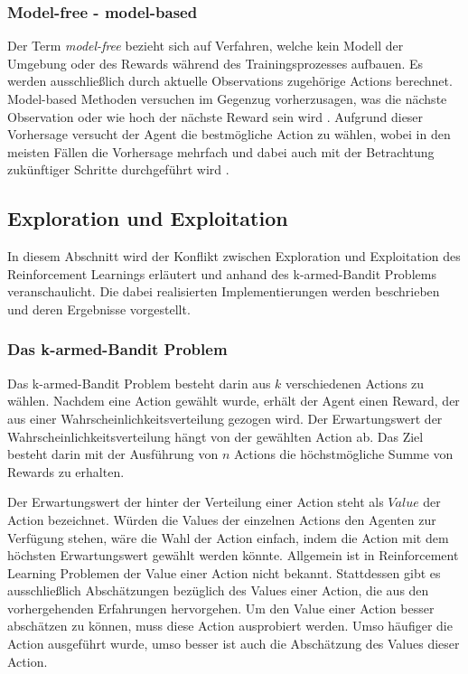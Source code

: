 \documentclass[11pt]{scrartcl}
\begin{document}
\subsubsection{Model-free - model-based}
Der Term \textit{model-free} bezieht sich auf Verfahren, welche kein Modell der Umgebung oder des Rewards
während des Trainingsprozesses aufbauen. Es werden ausschließlich durch aktuelle Observations
zugehörige Actions berechnet. Model-based Methoden versuchen im Gegenzug vorherzusagen, was 
die nächste Observation oder wie hoch der nächste Reward sein wird \cite[~S.NA]{L2018}. Aufgrund dieser
Vorhersage versucht der Agent die bestmögliche Action zu wählen, wobei in den meisten
Fällen die Vorhersage mehrfach und dabei auch mit der Betrachtung zukünftiger Schritte durchgeführt
wird \cite[~S.NA]{L2018}.


\subsection{Exploration und Exploitation}
In diesem Abschnitt wird der Konflikt zwischen Exploration und Exploitation des
Reinforcement Learnings erläutert und anhand des k-armed-Bandit Problems veranschaulicht.
Die dabei realisierten Implementierungen werden beschrieben und deren Ergebnisse
vorgestellt.


\subsubsection{Das k-armed-Bandit Problem}
Das k-armed-Bandit Problem besteht darin aus $k$ verschiedenen Actions zu wählen.
Nachdem eine Action gewählt wurde, erhält der Agent einen Reward, der aus einer
Wahrscheinlichkeitsverteilung gezogen wird. Der Erwartungswert der
Wahrscheinlichkeitsverteilung hängt von der gewählten Action ab. Das Ziel besteht darin
mit der Ausführung von $n$ Actions die höchstmögliche Summe von Rewards zu erhalten.

Der Erwartungswert der hinter der Verteilung einer Action steht als $Value$ der Action
bezeichnet. Würden die Values der einzelnen Actions den Agenten zur Verfügung stehen, wäre die 
Wahl der Action einfach, indem die Action mit dem höchsten Erwartungswert gewählt werden 
könnte. Allgemein ist in Reinforcement Learning Problemen der Value einer Action nicht bekannt.
Stattdessen gibt es ausschließlich Abschätzungen bezüglich des Values einer Action, die aus den
vorhergehenden Erfahrungen hervorgehen. Um den Value einer Action besser abschätzen zu können,
muss diese Action ausprobiert werden. Umso häufiger die Action ausgeführt wurde, umso besser
ist auch die Abschätzung des Values dieser Action.
\end{document}

